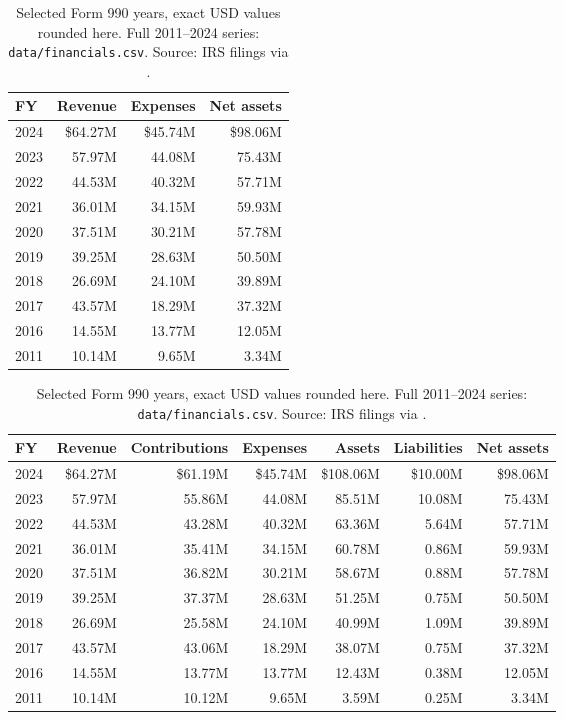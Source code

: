 \documentclass[10pt,letterpaper,twocolumn]{article}
\begin{document}
\begin{table}[t]
\ifdefined\cardindex
\scriptsize\centering\setlength{\tabcolsep}{4pt}
\begin{tabular}{@{}lrrr@{}}
\toprule
\textbf{FY} & \textbf{Revenue} & \textbf{Expenses} & \textbf{Net assets}\\
\midrule
2024 & \$64.27M & \$45.74M & \$98.06M\\
2023 & 57.97M & 44.08M & 75.43M\\
2022 & 44.53M & 40.32M & 57.71M\\
2021 & 36.01M & 34.15M & 59.93M\\
2020 & 37.51M & 30.21M & 57.78M\\
2019 & 39.25M & 28.63M & 50.50M\\
2018 & 26.69M & 24.10M & 39.89M\\
2017 & 43.57M & 18.29M & 37.32M\\
2016 & 14.55M & 13.77M & 12.05M\\
2011 & 10.14M & 9.65M & 3.34M\\
\bottomrule
\end{tabular}
\else
\footnotesize\centering\setlength{\tabcolsep}{4pt}
\begin{tabularx}{\textwidth}{lrrrrrr}
\toprule
\textbf{FY} & \textbf{Revenue} & \textbf{Contributions} & \textbf{Expenses} & \textbf{Assets} & \textbf{Liabilities} & \textbf{Net assets}\\
\midrule
2024 & \$64.27M & \$61.19M & \$45.74M & \$108.06M & \$10.00M & \$98.06M\\
2023 & 57.97M & 55.86M & 44.08M & 85.51M & 10.08M & 75.43M\\
2022 & 44.53M & 43.28M & 40.32M & 63.36M & 5.64M & 57.71M\\
2021 & 36.01M & 35.41M & 34.15M & 60.78M & 0.86M & 59.93M\\
2020 & 37.51M & 36.82M & 30.21M & 58.67M & 0.88M & 57.78M\\
2019 & 39.25M & 37.37M & 28.63M & 51.25M & 0.75M & 50.50M\\
2018 & 26.69M & 25.58M & 24.10M & 40.99M & 1.09M & 39.89M\\
2017 & 43.57M & 43.06M & 18.29M & 38.07M & 0.75M & 37.32M\\
2016 & 14.55M & 13.77M & 13.77M & 12.43M & 0.38M & 12.05M\\
2011 & 10.14M & 10.12M & 9.65M & 3.59M & 0.25M & 3.34M\\
\bottomrule
\end{tabularx}
\fi
\caption{Selected Form 990 years, exact USD values rounded here. Full 2011--2024 series: \texttt{data/financials.csv}. Source: IRS filings via \citet{pp990}.}
\end{table}
\end{document}
